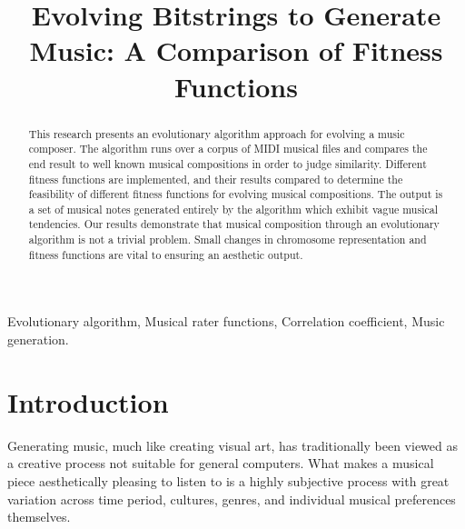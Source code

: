 \documentclass[conference]{IEEEtran}
\begin{document}
\title{Evolving Bitstrings to Generate Music: A Comparison of Fitness Functions\\}

\author{
\and
{}
\and
{}
}

\maketitle

\begin{abstract}
This research presents an evolutionary algorithm approach for evolving a music composer. The algorithm runs over a corpus of MIDI musical files and compares the end result to well known musical compositions in order to judge similarity. Different fitness functions are implemented, and their results compared to determine the feasibility of different fitness functions for evolving musical compositions. The output is a set of musical notes generated entirely by the algorithm which exhibit vague musical tendencies. Our results demonstrate that musical composition through an evolutionary algorithm is not a trivial problem. Small changes in chromosome representation and fitness functions are vital to ensuring an aesthetic output.
\end{abstract} 

\begin{IEEEkeywords}
Evolutionary algorithm, Musical rater functions, Correlation coefficient, Music generation.
\end{IEEEkeywords}

\section{Introduction}
Generating music, much like creating visual art, has traditionally been viewed as a creative process not suitable for general computers. What makes a musical piece aesthetically pleasing to listen to is a highly subjective process with great variation across time period, cultures, genres, and individual musical preferences themselves.
\end{document}

